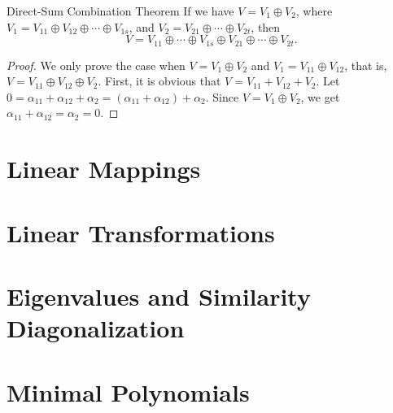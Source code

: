 \begin{proposition}{Direct-Sum Combination Theorem}{}
  If we have $V = V_1 \oplus V_2$,
  where $V_1 = V_{11} \oplus V_{12} \oplus \cdots \oplus V_{1s}$,
  and $V_2 = V_{21} \oplus \cdots \oplus V_{2t}$,
  then
  \begin{equation}
    V = V_{11} \oplus \cdots \oplus V_{1s} \oplus V_{21} \oplus \cdots \oplus V_{2t}.
  \end{equation}
\end{proposition}

\begin{proof}
  We only prove the case when $V = V_1 \oplus V_2$ and $V_1 = V_{11} \oplus
  V_{12}$,
  that is, $V = V_{11} \oplus V_{12} \oplus V_2$.
  First, it is obvious that $V = V_{11} + V_{12} + V_2$.
  Let $0 = \alpha_{11} + \alpha_{12} + \alpha_2 = (\alpha_{11} + \alpha_{12}) + \alpha_2$.
  Since $V = V_1 \oplus V_2$,
  we get $\alpha_{11} + \alpha_{12} = \alpha_2 = 0$.
\end{proof}


\section{Linear Mappings}


\section{Linear Transformations}

\section{Eigenvalues and Similarity Diagonalization}

\section{Minimal Polynomials}




